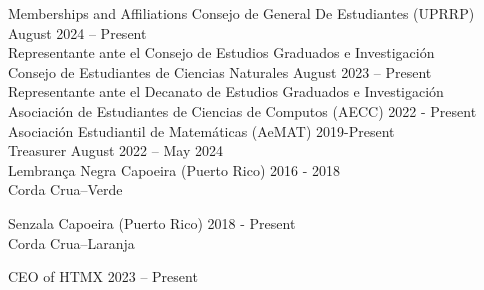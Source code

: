 \documentclass{resume} %
\begin{document}
\begin{rSection}{Memberships and Affiliations}
    Consejo de General De Estudiantes (UPRRP) \hfill{August 2024 -- Present} \\
    \hspace*{17mm} Representante ante el Consejo de Estudios
    Graduados e Investigaci\'on \\

    Consejo de Estudiantes de Ciencias Naturales \hfill{August 2023 -- Present} \\
    \hspace*{17mm} Representante ante el Decanato de Estudios
    Graduados e Investigaci\'on \\

    Asociaci\'on de Estudiantes de Ciencias de Computos (AECC) \hfill{2022 - Present} \\

    Asociaci\'on Estudiantil de Matem\'aticas (AeMAT) \hfill{2019-Present} \\

    \hspace*{17mm} Treasurer \hfill{August 2022 -- May 2024}   \\

    Lembran\c{c}a Negra Capoeira (Puerto Rico) \hfill{2016 - 2018} \\
    \hspace*{17mm} Corda Crua--Verde

    Senzala Capoeira (Puerto Rico) \hfill{2018 - Present} \\
    \hspace*{17mm} Corda Crua--Laranja

    CEO of HTMX \hfill{2023 -- Present} \\
\end{rSection}
\end{document}
